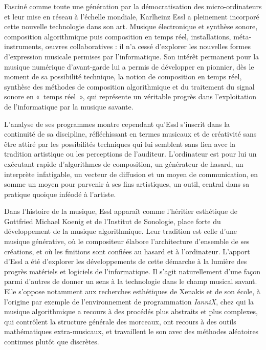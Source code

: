 \documentclass[a4paper,12pt]{article}
\newcommand{\guill}[1]{«~#1~»}
\begin{document}
Fasciné comme toute une génération par la démocratisation des micro-ordinateurs et leur mise en réseau à l'échelle mondiale, Karlheinz Essl a pleinement incorporé cette nouvelle technologie dans son art. Musique électronique et synthèse sonore, composition algorithmique puis composition en temps réel, installations, méta-instruments, œuvres collaboratives : il n'a cessé d'explorer les nouvelles formes d'expression musicale permises par l'informatique. Son intérêt permanent pour la musique numérique d'avant-garde lui a permis de développer en pionnier, dès le moment de sa possibilité technique, la notion de composition en temps réel, synthèse des méthodes de composition algorithmique et du traitement du signal sonore en \guill{temps réel}, qui représente un véritable progrès dans l'exploitation de l'informatique par la musique savante.

L'analyse de ses programmes montre cependant qu'Essl s'inscrit dans la continuité de sa discipline, réfléchissant en termes musicaux et de créativité sans être attiré par les possibilités techniques qui lui semblent sans lien avec la tradition artistique ou les perceptions de l'auditeur. L'ordinateur est pour lui un exécutant rapide d'algorithmes de composition, un générateur de hasard, un interprète infatigable, un vecteur de diffusion et un moyen de communication, en somme un moyen pour parvenir à ses fins artistiques, un outil, central dans sa pratique quoique inféodé à l'artiste.

Dans l'histoire de la musique, Essl apparaît comme l'héritier esthétique de Gottfried Michael Koenig et de l'Institut de Sonologie, place forte du développement de la musique algorithmique. Leur tradition est celle d'une musique générative, où le compositeur élabore l'architecture d'ensemble de ses créations, et où les finitions sont confiées au hasard et à l'ordinateur. L'apport d'Essl a été d'explorer les développements de cette démarche à la lumière des progrès matériels et logiciels de l'informatique. Il s'agit naturellement d'une façon parmi d'autres de donner un sens à la technologie dans le champ musical savant. Elle s'oppose notamment aux recherches esthétiques de Xenakis et de son école, à l'origine par exemple de l'environnement de programmation \emph{IanniX}, chez qui la musique algorithmique a recours à des procédés plus abstraits et plus complexes, qui contrôlent la structure générale des morceaux, ont recours à des outils mathématiques extra-musicaux, et travaillent le son avec des méthodes aléatoires continues plutôt que discrètes.
\end{document}
